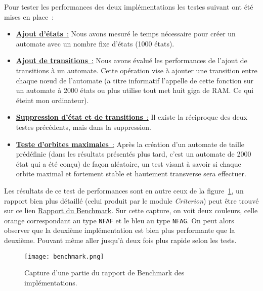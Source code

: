\vphantom{}

Pour tester les performances des deux implémentations les testes suivant ont été 
mises en place~:

\begin{itemize}
  \item[\textbullet] \underline{\textbf{Ajout d'états}~:} Nous avons mesuré le 
  temps nécessaire pour créer un automate avec un nombre fixe d'états 
  (1000 états).
  \item[\textbullet] \underline{\textbf{Ajout de transitions}~:} Nous avons 
  évalué les performances de l'ajout de transitions à un automate. 
  Cette opération vise à ajouter une transition entre chaque n\oe ud de 
  l'automate (a titre informatif l'appelle de cette fonction sur un automate à 
  2000 états ou plus utilise tout met huit giga de RAM. Ce qui éteint mon 
  ordinateur).
  \item[\textbullet] \underline{\textbf{Suppression d'état et de transitions}~:}
  Il existe la réciproque des deux testes précédents, mais dans la suppression.
  \item[\textbullet] \underline{\textbf{Teste d'orbites maximales}~:} Après la 
  création d'un automate de taille prédéfinie (dans les résultats présentés plus 
  tard, c'est un automate de 2000 état qui a été conçu) de façon aléatoire, un 
  test visant à savoir si chaque orbite maximal et fortement stable et hautement 
  transverse sera effectuer.
\end{itemize}

\vphantom{}

Les résultats de ce test de performances sont en autre ceux de la 
figure~\ref{fig:imgBench}, un rapport bien plus détaillé (celui produit par le 
module \textit{Criterion}) peut être trouvé sur ce lien 
\href{run:./report_perf.html}{Rapport du Benchmark}. Sur cette capture, on voit 
deux couleurs, celle orange correspondant au type \texttt{NFAF} et 
le bleu au type \texttt{NFAG}. On peut alors observer que la 
deuxième implémentation est bien plus performante que la deuxième. Pouvant même 
aller jusqu'à deux fois plus rapide selon les tests.

\begin{figure}[H]
  \texttt{[image: benchmark.png]}
  \caption{
    Capture d'une partie du rapport de Benchmark des implémentations.
  }\label{fig:imgBench}
\end{figure}


